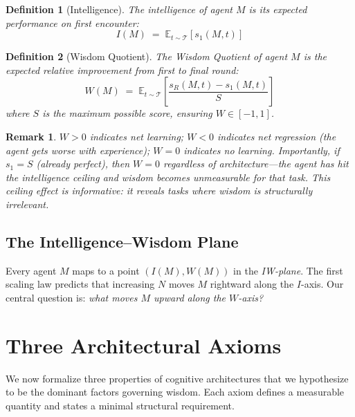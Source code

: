 \documentclass{article}
\newtheorem{definition}{Definition}
\newtheorem{remark}{Remark}
\newcommand{\cT}{\mathcal{T}}
\newcommand{\E}{\mathbb{E}}
\begin{document}
\begin{definition}[Intelligence]
\label{def:intelligence}
The \emph{intelligence} of agent $M$ is its expected performance on first encounter:
\begin{equation}
    I(M) \;=\; \E_{t \sim \cT}\left[s_1(M, t)\right]
\end{equation}
\end{definition}

\begin{definition}[Wisdom Quotient]
\label{def:wisdom}
The \emph{Wisdom Quotient} of agent $M$ is the expected relative improvement from first to final round:
\begin{equation}
    W(M) \;=\; \E_{t \sim \cT}\left[\frac{s_R(M, t) - s_1(M, t)}{S}\right]
\end{equation}
where $S$ is the maximum possible score, ensuring $W \in [-1, 1]$.
\end{definition}

\begin{remark}
$W > 0$ indicates net learning; $W < 0$ indicates net regression (the agent gets \emph{worse} with experience); $W = 0$ indicates no learning.
Importantly, if $s_1 = S$ (already perfect), then $W = 0$ regardless of architecture---the agent has hit the \emph{intelligence ceiling} and wisdom becomes unmeasurable for that task.
This ceiling effect is informative: it reveals tasks where wisdom is structurally irrelevant.
\end{remark}

\subsection{The Intelligence--Wisdom Plane}

Every agent $M$ maps to a point $(I(M), W(M))$ in the \emph{IW-plane}.
The first scaling law predicts that increasing $N$ moves $M$ rightward along the $I$-axis.
Our central question is: \emph{what moves $M$ upward along the $W$-axis?}

\section{Three Architectural Axioms}
\label{sec:axioms}

We now formalize three properties of cognitive architectures that we hypothesize to be the dominant factors governing wisdom.
Each axiom defines a measurable quantity and states a minimal structural requirement.
\end{document}
